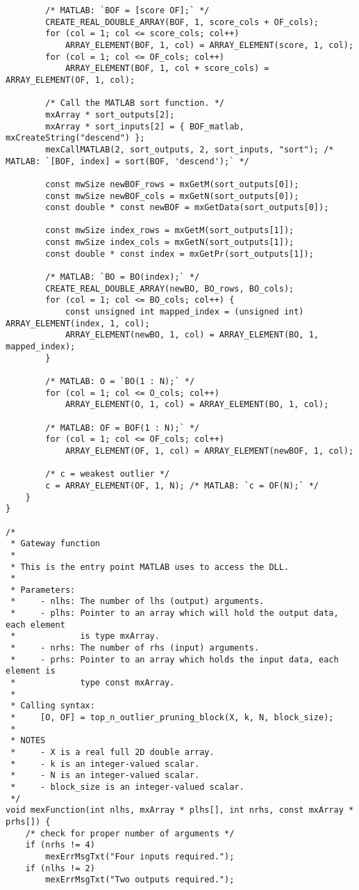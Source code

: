 \begin{lstlisting}
        /* MATLAB: `BOF = [score OF];` */
        CREATE_REAL_DOUBLE_ARRAY(BOF, 1, score_cols + OF_cols);
        for (col = 1; col <= score_cols; col++)
            ARRAY_ELEMENT(BOF, 1, col) = ARRAY_ELEMENT(score, 1, col);
        for (col = 1; col <= OF_cols; col++)
            ARRAY_ELEMENT(BOF, 1, col + score_cols) = ARRAY_ELEMENT(OF, 1, col);
        
        /* Call the MATLAB sort function. */
        mxArray * sort_outputs[2];
        mxArray * sort_inputs[2] = { BOF_matlab, mxCreateString("descend") };
        mexCallMATLAB(2, sort_outputs, 2, sort_inputs, "sort"); /* MATLAB: `[BOF, index] = sort(BOF, 'descend');` */

        const mwSize newBOF_rows = mxGetM(sort_outputs[0]);
        const mwSize newBOF_cols = mxGetN(sort_outputs[0]);
        const double * const newBOF = mxGetData(sort_outputs[0]);

        const mwSize index_rows = mxGetM(sort_outputs[1]);
        const mwSize index_cols = mxGetN(sort_outputs[1]);
        const double * const index = mxGetPr(sort_outputs[1]);

        /* MATLAB: `BO = BO(index);` */
        CREATE_REAL_DOUBLE_ARRAY(newBO, BO_rows, BO_cols);
        for (col = 1; col <= BO_cols; col++) {
            const unsigned int mapped_index = (unsigned int) ARRAY_ELEMENT(index, 1, col);
            ARRAY_ELEMENT(newBO, 1, col) = ARRAY_ELEMENT(BO, 1, mapped_index);
        }

        /* MATLAB: O = `BO(1 : N);` */
        for (col = 1; col <= O_cols; col++)
            ARRAY_ELEMENT(O, 1, col) = ARRAY_ELEMENT(BO, 1, col);

        /* MATLAB: OF = BOF(1 : N);` */
        for (col = 1; col <= OF_cols; col++)
            ARRAY_ELEMENT(OF, 1, col) = ARRAY_ELEMENT(newBOF, 1, col);

        /* c = weakest outlier */
        c = ARRAY_ELEMENT(OF, 1, N); /* MATLAB: `c = OF(N);` */
    }
}
 
/*
 * Gateway function
 *
 * This is the entry point MATLAB uses to access the DLL.
 *
 * Parameters:
 *     - nlhs: The number of lhs (output) arguments.
 *     - plhs: Pointer to an array which will hold the output data, each element
 *             is type mxArray.
 *     - nrhs: The number of rhs (input) arguments.
 *     - prhs: Pointer to an array which holds the input data, each element is
 *             type const mxArray.
 *
 * Calling syntax:
 *     [O, OF] = top_n_outlier_pruning_block(X, k, N, block_size);
 *
 * NOTES
 *     - X is a real full 2D double array.
 *     - k is an integer-valued scalar.
 *     - N is an integer-valued scalar.
 *     - block_size is an integer-valued scalar.
 */
void mexFunction(int nlhs, mxArray * plhs[], int nrhs, const mxArray * prhs[]) {
    /* check for proper number of arguments */
    if (nrhs != 4)
        mexErrMsgTxt("Four inputs required.");
    if (nlhs != 2)
        mexErrMsgTxt("Two outputs required.");


\end{lstlisting}
